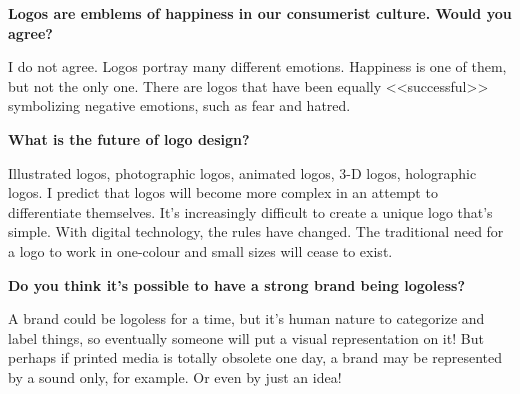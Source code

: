 \textbf{Logos are emblems of happiness in our consumerist culture. Would you
  agree?}

I do not agree. Logos portray many different emotions. Happiness is one of them,
but not the only one. There are logos that have been equally <<successful>>
symbolizing negative emotions, such as fear and hatred.


\textbf{What is the future of logo design?}

Illustrated logos, photographic logos, animated logos, 3-D logos, holographic
logos. I predict that logos will become more complex in an attempt to
differentiate themselves. It's increasingly difficult to create a unique logo
that's simple. With digital technology, the rules have changed. The traditional
need for a logo to work in one-colour and small sizes will cease to exist.


\textbf{Do you think it's possible to have a strong brand being logoless?}

A brand could be logoless for a time, but it's human nature to categorize and
label things, so eventually someone will put a visual representation on it! But
perhaps if printed media is totally obsolete one day, a brand may be represented
by a sound only, for example. Or even by just an idea!
